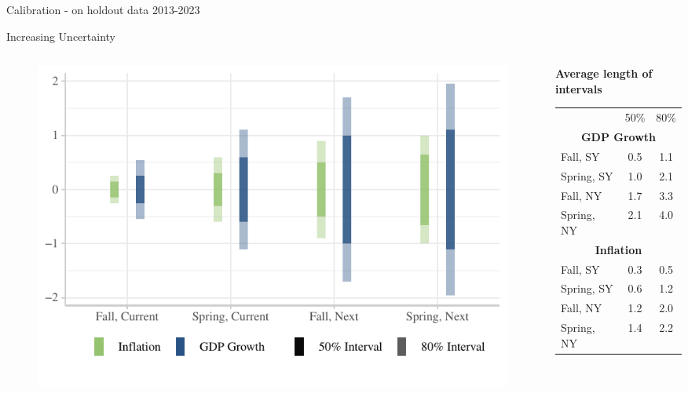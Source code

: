 \documentclass[en]{sdqbeamer}
\begin{document}
\begin{frame}{Calibration - on holdout data 2013-2023}
\end{frame}

\begin{frame}{Increasing Uncertainty}
\begin{columns}
\begin{column}{0.6\textwidth}
    \begin{figure}
        \centering
        \includegraphics[width=\textwidth]{figures/cilength_byhorizon.pdf}
        \label{fig:enter-label}
    \end{figure}
\end{column}
\begin{column}{0.4\textwidth}
\centering
\textbf{Average length of intervals}
\begin{table}
\begin{tabular}{ l c c }
&   50\%  & 80\%\\[0.3em]
\multicolumn{3}{c}{\textbf{GDP Growth}}\\
Fall,  SY & 0.5 & 1.1\\ 
Spring, SY &1.0 &2.1 \\ 
Fall, NY & 1.7 & 3.3\\ 
Spring, NY &2.1 &4.0 \\[0.3em] 
\multicolumn{3}{c}{\textbf{Inflation}}\\
Fall,  SY & 0.3 & 0.5\\ 
Spring, SY &0.6 &1.2 \\ 
Fall, NY & 1.2 & 2.0\\ 
Spring, NY &1.4 &2.2 \\ 
\end{tabular}
\end{table}
\vspace{1.25cm}
\end{column}
\end{columns}


\end{frame}
\end{document}
